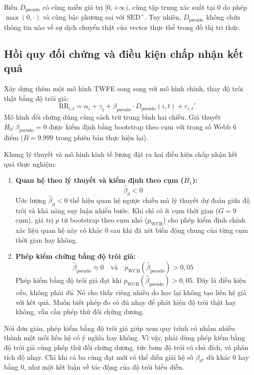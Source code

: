 Biến $D_{\text{pseudo}}$ có cùng miền giá trị $[0, +\infty)$, cùng tập trung xác suất tại 0 do phép $\max(0, \cdot)$ và cùng bậc phương sai với $\text{SED}^+$. Tuy nhiên, $D_{\text{pseudo}}$ không chứa thông tin nào về sự dịch chuyển thật của vector thực thể trong đồ thị tri thức.

\subsection{Hồi quy đối chứng và điều kiện chấp nhận kết quả}
Xây dựng thêm một mô hình TWFE song song với mô hình chính, thay độ trôi thật bằng độ trôi giả:
\begin{equation}
\text{RR}_{i,t} = \alpha_i + \gamma_t + \beta_{\text{pseudo}} \cdot D_{\text{pseudo}}(i,t) + \varepsilon_{i,t}'
\label{eq:falsification_twfe}
\end{equation}
Mô hình đối chứng dùng cùng cách trừ trung bình hai chiều. Giả thuyết $H_0: \beta_{\text{pseudo}} = 0$ được kiểm định bằng bootstrap theo cụm với trọng số Webb 6 điểm ($B = 9.999$ trong phiên bản thực hiện lại).


\begin{criterion}
Khung lý thuyết và mô hình kinh tế lượng đặt ra hai điều kiện chấp nhận kết quả thực nghiệm:
\begin{enumerate}
    \item \textbf{Quan hệ theo lý thuyết và kiểm định theo cụm ($H_1$):}
    \begin{equation}
    \widehat{\beta}_d < 0
    \end{equation}
    Ước lượng $\widehat{\beta}_d < 0$ thể hiện quan hệ ngược chiều mà lý thuyết dự đoán giữa độ trôi và khả năng suy luận nhiều bước. Khi chỉ có ít cụm thời gian ($G = 9$ cụm), giá trị $p$ từ bootstrap theo cụm nhỏ ($p_{\text{WCB}}$) cho phép kiểm định chính xác liệu quan hệ này có khác 0 sau khi đã xét biến động chung của từng cụm thời gian hay không.
    \item \textbf{Phép kiểm chứng bằng độ trôi giả:}
    \begin{equation}
    \widehat{\beta}_{\text{pseudo}} \approx 0 \quad \text{và} \quad p_{\text{WCB}}(\widehat{\beta}_{\text{pseudo}}) > 0{,}05
    \end{equation}
    Phép kiểm bằng độ trôi giả đạt khi $p_{\text{WCB}}(\widehat{\beta}_{\text{pseudo}}) > 0{,}05$. Đây là điều kiện \textit{cần}, không phải \textit{đủ}. Nó cho thấy riêng nhiễu do học lại không tạo liên hệ giả với kết quả. Muốn biết phép đo có đủ nhạy để phát hiện độ trôi thật hay không, vẫn cần phép thử đối chứng dương.
\end{enumerate}
\end{criterion}
Nói đơn giản, phép kiểm bằng độ trôi giả giúp xem quy trình có nhầm nhiễu thành một mối liên hệ có ý nghĩa hay không.
Vì vậy, phải dùng phép kiểm bằng độ trôi giả cùng phép thử đối chứng dương, tức bơm độ trôi có chủ đích, và phân tích độ nhạy. Chỉ khi cả ba cùng đạt mới có thể diễn giải hệ số $\beta_d$, dù khác 0 hay bằng 0, như một kết luận về tác động của độ trôi biểu diễn.
